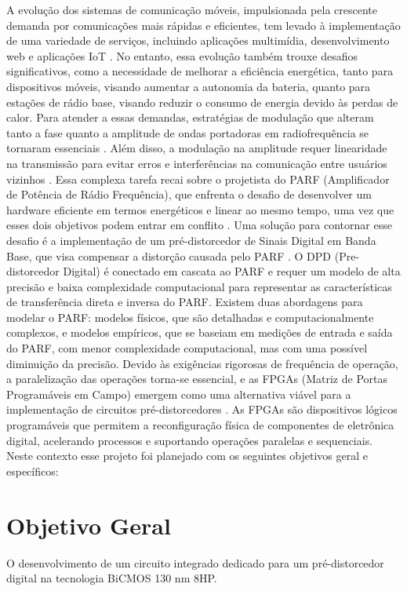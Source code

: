 A evolução dos sistemas de comunicação móveis, impulsionada pela crescente demanda por comunicações mais rápidas e eficientes, tem levado à implementação de uma variedade de serviços, incluindo aplicações multimídia, desenvolvimento web e aplicações IoT \cite{John2016}. No entanto, essa evolução também trouxe desafios significativos, como a necessidade de melhorar a eficiência energética, tanto para dispositivos móveis, visando aumentar a autonomia da bateria, quanto para estações de rádio base, visando reduzir o consumo de energia devido às perdas de calor. Para atender a essas demandas, estratégias de modulação que alteram tanto a fase quanto a amplitude de ondas portadoras em radiofrequência se tornaram essenciais \cite{Kenington2000}. Além disso, a modulação na amplitude requer linearidade na transmissão para evitar erros e interferências na comunicação entre usuários vizinhos \cite{Cripps2006}. Essa complexa tarefa recai sobre o projetista do PARF (Amplificador de Potência de Rádio Frequência), que enfrenta o desafio de desenvolver um hardware eficiente em termos energéticos e linear ao mesmo tempo, uma vez que esses dois objetivos podem entrar em conflito \cite{Chavez2018}. Uma solução para contornar esse desafio é a implementação de um pré-distorcedor de Sinais Digital em Banda Base, que visa compensar a distorção causada pelo PARF \cite{Cripps2006}. O DPD (Pre-distorcedor Digital) é conectado em cascata ao PARF e requer um modelo de alta precisão e baixa complexidade computacional para representar as características de transferência direta e inversa do PARF. Existem duas abordagens para modelar o PARF: modelos físicos, que são detalhadas e computacionalmente complexos, e modelos empíricos, que se baseiam em medições de entrada e saída do PARF, com menor complexidade computacional, mas com uma possível diminuição da precisão. Devido às exigências rigorosas de frequência de operação, a paralelização das operações torna-se essencial, e as FPGAs (Matriz de Portas Programáveis em Campo) emergem como uma alternativa viável para a implementação de circuitos pré-distorcedores \cite{Pedroni2010}. As FPGAs são dispositivos lógicos programáveis que permitem a reconfiguração física de componentes de eletrônica digital, acelerando processos e suportando operações paralelas e sequenciais. Neste contexto esse projeto foi planejado com os seguintes objetivos geral e específicos:

\section{Objetivo Geral}
O desenvolvimento de um circuito integrado dedicado para um pré-distorcedor digital na tecnologia BiCMOS 130 nm 8HP.
